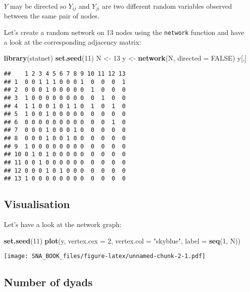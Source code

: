 \documentclass[]{book}
\newenvironment{Shaded}{\begin{snugshade}}{\end{snugshade}}
\newcommand{\KeywordTok}[1]{\textcolor[rgb]{0.13,0.29,0.53}{\textbf{{#1}}}}
\newcommand{\DataTypeTok}[1]{\textcolor[rgb]{0.13,0.29,0.53}{{#1}}}
\newcommand{\DecValTok}[1]{\textcolor[rgb]{0.00,0.00,0.81}{{#1}}}
\newcommand{\StringTok}[1]{\textcolor[rgb]{0.31,0.60,0.02}{{#1}}}
\newcommand{\OtherTok}[1]{\textcolor[rgb]{0.56,0.35,0.01}{{#1}}}
\newcommand{\NormalTok}[1]{{#1}}
\begin{document}
\(Y\) may be directed so \(Y_{ij}\) and \(Y_{ji}\) are two different
random variables observed between the same pair of nodes.

Let's create a random network on 13 nodes using the \texttt{network}
function and have a look at the corresponding adjacency matrix:

\begin{Shaded}
\begin{Highlighting}[]
\KeywordTok{library}\NormalTok{(statnet)}
\KeywordTok{set.seed}\NormalTok{(}\DecValTok{11}\NormalTok{)}
\NormalTok{N <-}\StringTok{ }\DecValTok{13}
\NormalTok{y <-}\StringTok{ }\KeywordTok{network}\NormalTok{(N, }\DataTypeTok{directed =} \OtherTok{FALSE}\NormalTok{)}
\NormalTok{y[,]}
\end{Highlighting}
\end{Shaded}

\begin{verbatim}
##    1 2 3 4 5 6 7 8 9 10 11 12 13
## 1  0 0 1 1 1 0 0 0 1  0  0  0  1
## 2  0 0 0 1 0 0 0 0 0  1  0  0  0
## 3  1 0 0 0 0 0 0 0 0  0  1  0  0
## 4  1 1 0 0 1 0 1 1 0  1  0  1  0
## 5  1 0 0 1 0 0 0 0 0  0  0  0  0
## 6  0 0 0 0 0 0 0 0 0  0  0  1  0
## 7  0 0 0 1 0 0 0 1 0  0  0  0  0
## 8  0 0 0 1 0 0 1 0 0  0  0  0  0
## 9  1 0 0 0 0 0 0 0 0  0  0  0  0
## 10 0 1 0 1 0 0 0 0 0  0  0  0  0
## 11 0 0 1 0 0 0 0 0 0  0  0  0  0
## 12 0 0 0 1 0 1 0 0 0  0  0  0  0
## 13 1 0 0 0 0 0 0 0 0  0  0  0  0
\end{verbatim}

\subsection{Visualisation}\label{visualisation}

Let's have a look at the network graph:

\begin{Shaded}
\begin{Highlighting}[]
\KeywordTok{set.seed}\NormalTok{(}\DecValTok{11}\NormalTok{)}
\KeywordTok{plot}\NormalTok{(y, }\DataTypeTok{vertex.cex =} \DecValTok{2}\NormalTok{, }\DataTypeTok{vertex.col =} \StringTok{"skyblue"}\NormalTok{, }\DataTypeTok{label =} \KeywordTok{seq}\NormalTok{(}\DecValTok{1}\NormalTok{, N))}
\end{Highlighting}
\end{Shaded}

\texttt{[image: SNA\_BOOK\_files/figure-latex/unnamed-chunk-2-1.pdf]}

\subsection{Number of dyads}\label{number-of-dyads}
\end{document}
